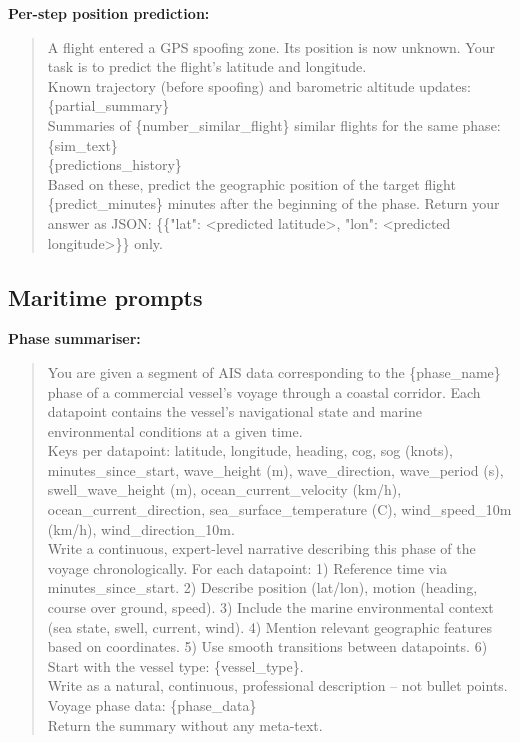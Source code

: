 \textbf{Per-step position prediction:}
\begin{quote}
\footnotesize\ttfamily
A flight entered a GPS spoofing zone. Its position is now unknown. Your
task is to predict the flight's latitude and longitude.\\[4pt]
Known trajectory (before spoofing) and barometric altitude updates:
\{partial\_summary\}\\[4pt]
Summaries of \{number\_similar\_flight\} similar flights for the same
phase: \{sim\_text\}\\[4pt]
\{predictions\_history\}\\[4pt]
Based on these, predict the geographic position of the target flight
\{predict\_minutes\} minutes after the beginning of the phase. Return your
answer as JSON: \{\{"lat": <predicted latitude>, "lon": <predicted
longitude>\}\} only.
\end{quote}

\subsection{Maritime prompts}

\textbf{Phase summariser:}
\begin{quote}
\footnotesize\ttfamily
You are given a segment of AIS data corresponding to the \{phase\_name\}
phase of a commercial vessel's voyage through a coastal corridor. Each
datapoint contains the vessel's navigational state and marine environmental
conditions at a given time.\\[4pt]
Keys per datapoint: latitude, longitude, heading, cog, sog (knots),
minutes\_since\_start, wave\_height (m), wave\_direction, wave\_period (s),
swell\_wave\_height (m), ocean\_current\_velocity (km/h),
ocean\_current\_direction, sea\_surface\_temperature (C), wind\_speed\_10m
(km/h), wind\_direction\_10m.\\[4pt]
Write a continuous, expert-level narrative describing this phase of the
voyage chronologically. For each datapoint: 1) Reference time via
minutes\_since\_start. 2) Describe position (lat/lon), motion (heading,
course over ground, speed). 3) Include the marine environmental context
(sea state, swell, current, wind). 4) Mention relevant geographic features
based on coordinates. 5) Use smooth transitions between datapoints. 6)
Start with the vessel type: \{vessel\_type\}.\\[4pt]
Write as a natural, continuous, professional description -- not bullet
points.\\[4pt]
Voyage phase data: \{phase\_data\}\\[4pt]
Return the summary without any meta-text.
\end{quote}

